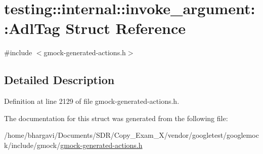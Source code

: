 \hypertarget{structtesting_1_1internal_1_1invoke__argument_1_1_adl_tag}{}\section{testing\+:\+:internal\+:\+:invoke\+\_\+argument\+:\+:Adl\+Tag Struct Reference}
\label{structtesting_1_1internal_1_1invoke__argument_1_1_adl_tag}


{\ttfamily \#include $<$gmock-\/generated-\/actions.\+h$>$}



\subsection{Detailed Description}


Definition at line 2129 of file gmock-\/generated-\/actions.\+h.



The documentation for this struct was generated from the following file\+:\begin{DoxyCompactItemize}
\item 
/home/bhargavi/\+Documents/\+S\+D\+R/\+Copy\+\_\+\+Exam\+\_\+X/vendor/googletest/googlemock/include/gmock/\hyperlink{gmock-generated-actions_8h}{gmock-\/generated-\/actions.\+h}\end{DoxyCompactItemize}
